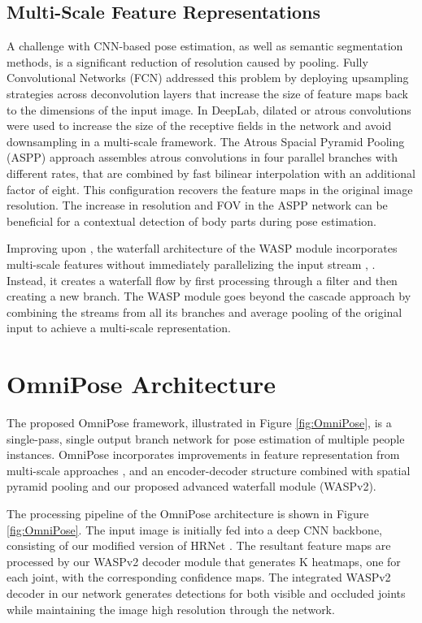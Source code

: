 \documentclass[10pt,twocolumn,letterpaper]{article}
\begin{document}
\subsection{Multi-Scale Feature Representations}
A challenge with CNN-based pose estimation, as well as semantic segmentation methods, is a significant reduction of resolution caused by pooling.
Fully Convolutional Networks (FCN) \cite{FCN} addressed
this problem by deploying upsampling strategies across deconvolution layers
that increase the size of feature maps back to the dimensions of the input image. 
In DeepLab, dilated or atrous convolutions \cite{DeepLab} were used to increase the size of the receptive fields in the network and avoid downsampling in a multi-scale framework. 
The Atrous Spacial Pyramid Pooling (ASPP) approach assembles atrous convolutions in four parallel branches with different rates, that are combined by fast bilinear interpolation with an additional factor of eight. This configuration recovers the feature maps in the original image resolution.
The increase in resolution and FOV in the ASPP network can be beneficial for a contextual detection of body parts during pose estimation.

Improving upon \cite{DeepLab}, the waterfall architecture of the WASP module incorporates multi-scale features without immediately parallelizing the input stream \cite{WASP}, \cite{UniPose}. Instead, it creates a waterfall flow by first processing through a filter and then creating a new branch. The WASP module goes beyond the cascade approach by combining the streams from all its branches and average pooling of the original input to achieve a multi-scale representation.

\section{OmniPose Architecture}
The proposed OmniPose framework, illustrated in Figure \ref{fig:OmniPose}, is a single-pass, single output branch network for pose estimation of multiple people instances. OmniPose incorporates improvements in feature representation from multi-scale approaches \cite{HRNet}, \cite{DarkPose} and an encoder-decoder structure combined with spatial pyramid pooling \cite{DeepLabv3+} and our proposed advanced waterfall module (WASPv2).


The processing pipeline of the OmniPose architecture is shown in Figure \ref{fig:OmniPose}. The input image is initially fed into a deep CNN backbone, consisting of our modified version of HRNet \cite{HRNet}. The resultant feature maps are processed by our WASPv2 decoder module that generates K heatmaps, one for each joint, with the corresponding confidence maps. The integrated WASPv2 decoder in our network generates detections for both visible and occluded joints while maintaining the image high resolution through the network. 
\end{document}
